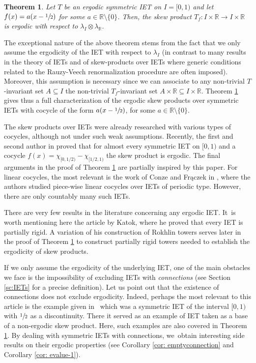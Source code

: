 \documentclass[JEP,XML,SOM,Unicode,NoEqCountersInSection,NoFloatCountersInSection,published]{cedram}
\theoremstyle{plain}
\newtheorem{theorem}{Theorem}[section]
\theoremstyle{definition}
\newcommand{\R}{\mathbb{R}}
\begin{document}
\begin{theorem}\label{thm: ergo}
Let $T$ be an ergodic symmetric IET on $I = [0, 1)$ and let $f(x)=a(x-\sfrac{1}{2})$ for some $a\in\R\setminus\{0\}$. Then, the skew product $T_f:I\times\R\to I\times \R$ is ergodic with respect to $\lambda_I\otimes\lambda_{\R}$.
\end{theorem}

The exceptional nature of the above theorem stems from the fact that we only assume the ergodicity of the IET with respect to $\lambda_I$ (in contrast to many results in the theory of IETs and of skew-products over IETs where generic conditions related to the Rauzy-Veech renormalization procedure are often imposed). Moreover, this assumption is necessary since we can associate to any non-trivial $T$-invariant set $A \subseteq I$ the non-trivial $T_f$-invariant set $A \times \R \subseteq I \times \R$. Theorem \ref{thm: ergo} gives thus a full characterization of the ergodic skew products over symmetric IETs with cocycle of the form $a(x-\sfrac{1}{2})$, for some $a \in \R\setminus \{0\}$.

The skew products over IETs were already researched with various types of cocycles, although not under such weak assumptions. Recently, the first and second author in \cite{berk_ergodicity_2024} proved that for almost every symmetric IET on $[0,1)$ and a cocycle $f(x)=\chi_{[0,1/2)}-\chi_{[1/2,1)}$ the skew product is ergodic. The final arguments in the proof of Theorem \ref{thm: ergo} are partially inspired by this paper. For linear cocycles, the most relevant is the work of Conze and Frączek in \cite{conze_cocycles_2011}, where the authors studied piece-wise linear cocycles over IETs of periodic type. However, there are only countably many such IETs.

There are very few results in the literature concerning any ergodic IET. It~is worth mentioning here the article \cite{katok_interval_1980} by Katok, where he proved that every IET is partially rigid. A variation of his construction of Rokhlin towers serves later in the proof of Theorem \ref{thm: ergo} to construct partially rigid towers needed to establish the ergodicity of skew products.

If we only assume the ergodicity of the underlying IET, one of the main obstacles we face is the impossibility of excluding IETs with \emph{connections} (see Section \ref{sc:IETs} for a precise definition). Let us point out that the existence of connections does not exclude ergodicity. Indeed, perhaps the most relevant to this article is the example given in~\cite{berk_ergodicity_2024} which was a symmetric IET of the interval $[0,1)$ with $\sfrac{1}{2}$ as a discontinuity. There it served as an example of IET taken as a base of a non-ergodic skew product. Here, such examples are also covered in Theorem \ref{thm: ergo}. By dealing with symmetric IETs with connections, we~obtain interesting side results on their ergodic properties (see Corollary \ref{cor: emptyconnection} and Corollary \ref{cor: evalue-1}).
\end{document}
